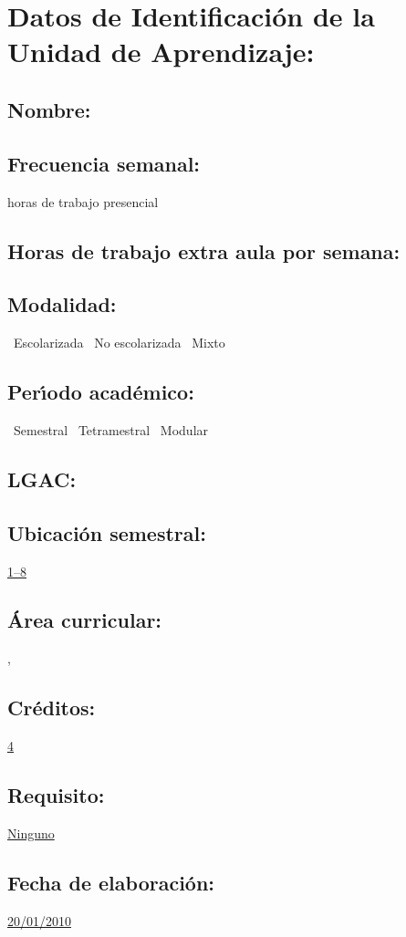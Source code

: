 \documentclass[10 pt]{article}
\begin{document}


\section{Datos de Identificaci\'{o}n de la Unidad de Aprendizaje:}
\subsection{Nombre:} 
\subsection{Frecuencia semanal:} horas de trabajo presencial 
\subsection{Horas de trabajo extra aula por semana:} 
\subsection{Modalidad:} \yes~Escolarizada \no~No escolarizada \no~Mixto
\subsection{Per\'{\i}odo acad\'{e}mico:} \yes~Semestral
\no~Tetramestral \no~Modular
\subsection{LGAC:} \underline{\seys}
\subsection{Ubicaci\'{o}n semestral:} \underline{1--8}
\subsection{\'{A}rea curricular:} \underline{\fr, \le}
\subsection{Cr\'{e}ditos:} \underline{4}
\subsection{Requisito:} \underline{Ninguno}
\subsection{Fecha de elaboraci\'{o}n:} \underline{20/01/2010}
\end{document}

